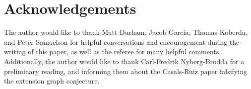 \documentclass[microtype]{gtpart}
\theoremstyle{definition}
\theoremstyle{theorem}
\begin{document}
\section*{Acknowledgements}

The author would like to thank Matt Durham, Jacob Garcia, Thomas Koberda, and 
Peter Samuelson for helpful conversations and encouragement during the 
writing of this paper, as well as the referee for many helpful comments. 
Additionally, the author would like to thank 
Carl-Fredrik Nyberg-Brodda for a preliminary reading, and informing them 
about the Casals-Ruiz paper falsifying the extension graph conjecture.


\newpage


\end{document}
